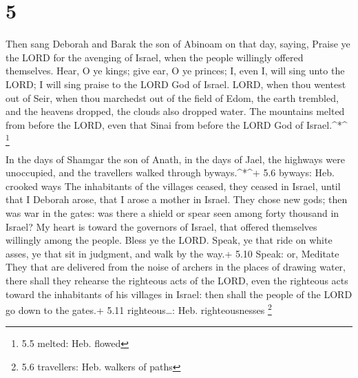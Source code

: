 \hypertarget{section-4}{%
\section{5}\label{section-4}}

 Then sang Deborah and Barak the son of Abinoam on that day,
saying,  Praise ye the LORD for the avenging of Israel, when
the people willingly offered themselves.  Hear, O ye kings;
give ear, O ye princes; I, even I, will sing unto the LORD; I will sing
praise to the LORD God of Israel.  LORD, when thou wentest
out of Seir, when thou marchedst out of the field of Edom, the earth
trembled, and the heavens dropped, the clouds also dropped water.
 The mountains melted from before the LORD, even that Sinai
from before the LORD God of Israel.\^{}*\^{} \footnote{5.5 melted: Heb.
  flowed}

 In the days of Shamgar the son of Anath, in the days of
Jael, the highways were unoccupied, and the travellers walked through
byways.\^{}*\^{}+ 5.6 byways: Heb. crooked ways  The
inhabitants of the villages ceased, they ceased in Israel, until that I
Deborah arose, that I arose a mother in Israel.  They chose
new gods; then was war in the gates: was there a shield or spear seen
among forty thousand in Israel?  My heart is toward the
governors of Israel, that offered themselves willingly among the people.
Bless ye the LORD.  Speak, ye that ride on white asses, ye
that sit in judgment, and walk by the way.+ 5.10 Speak: or, Meditate
 They that are delivered from the noise of archers in the
places of drawing water, there shall they rehearse the righteous acts of
the LORD, even the righteous acts toward the inhabitants of his villages
in Israel: then shall the people of the LORD go down to the gates.+ 5.11
righteous\ldots: Heb. righteousnesses \footnote{5.6 travellers: Heb.
  walkers of paths}

